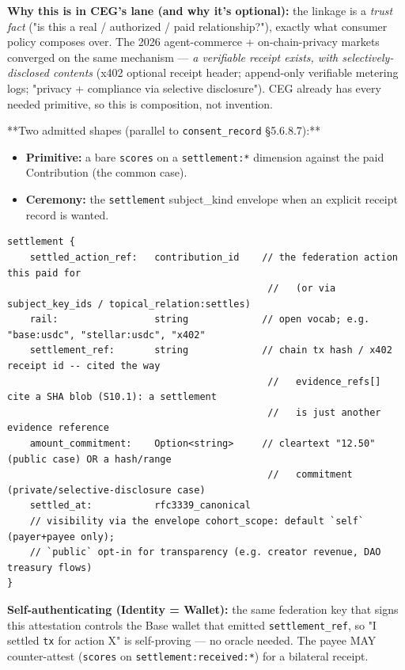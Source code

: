 \documentclass[10pt]{article}
\begin{document}
\textbf{Why this is in CEG's lane (and why it's optional):} the linkage is a \textit{trust fact} ("is this a real / authorized / paid relationship?"), exactly what consumer policy composes over. The 2026 agent-commerce + on-chain-privacy markets converged on the same mechanism — \textit{a verifiable receipt exists, with selectively-disclosed contents} (x402 optional receipt header; append-only verifiable metering logs; "privacy + compliance via selective disclosure"). CEG already has every needed primitive, so this is composition, not invention.


**Two admitted shapes (parallel to \texttt{consent\_record} §5.6.8.7):**

\begin{itemize}\setlength\itemsep{0pt}
\item \textbf{Primitive:} a bare \texttt{scores} on a \texttt{settlement:*} dimension against the paid Contribution (the common case).
\item \textbf{Ceremony:} the \texttt{settlement} subject\_kind envelope when an explicit receipt record is wanted.
\end{itemize}


\begin{lstlisting}
settlement {
    settled_action_ref:   contribution_id    // the federation action this paid for
                                              //   (or via subject_key_ids / topical_relation:settles)
    rail:                 string             // open vocab; e.g. "base:usdc", "stellar:usdc", "x402"
    settlement_ref:       string             // chain tx hash / x402 receipt id -- cited the way
                                              //   evidence_refs[] cite a SHA blob (S10.1): a settlement
                                              //   is just another evidence reference
    amount_commitment:    Option<string>     // cleartext "12.50" (public case) OR a hash/range
                                              //   commitment (private/selective-disclosure case)
    settled_at:           rfc3339_canonical
    // visibility via the envelope cohort_scope: default `self` (payer+payee only);
    // `public` opt-in for transparency (e.g. creator revenue, DAO treasury flows)
}
\end{lstlisting}

\textbf{Self-authenticating (Identity = Wallet):} the same federation key that signs this attestation controls the Base wallet that emitted \texttt{settlement\_ref}, so "I settled \texttt{tx} for action X" is self-proving — no oracle needed. The payee MAY counter-attest (\texttt{scores} on \texttt{settlement:received:*}) for a bilateral receipt.
\end{document}
